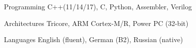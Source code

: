


\begin{cvskills}


\cvskill
{Programming} %
{C++(11/14/17), C, Python, Assembler, Verilog} %


\cvskill
{Architectures} %
{Tricore, ARM Cortex-M/R, Power PC (32-bit)} %


\cvskill
{Languages} %
{ English (fluent), German (B2), Russian (native)} %


\end{cvskills}